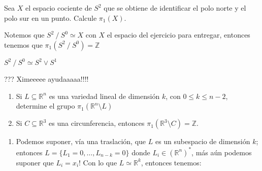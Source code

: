 \documentclass[11pt]{article}
\newcommand{\R}{{\mathbb{R}}}
\newcommand{\N}{{\mathbb{N}}}
\newenvironment{proof}[1][Demostraci\'on]{\begin{trivlist}
\item[\hskip \labelsep {\bfseries #1}]}{\end{trivlist}}
\newenvironment{declaration}[1][Afirmaci\'on]{\begin{trivlist}
\item[\hskip \labelsep {\bfseries #1}]}{\end{trivlist}}
\newcommand{\Z}{\mathbb{Z}}
\def \be{\begin{enumerate}}
\def \en{\end{enumerate}}
\begin{document}
\begin{enumerate}
\begin{proof}
\end{proof}



\item {Sea $X$ el espacio cociente de $S^2$ que se obtiene de identificar el polo norte y el polo sur en un punto. Calcule $\pi_1 (X)$.}

\begin{proof}

Notemos que $S^2 \ / \ S^0 \simeq X$ con $X$ el espacio del ejercicio para entregar, entonces tenemos que $\pi_1(S^2 \ / \ S^0)=\Z$

\begin{declaration}

$S^2 \ / \ S^0 \simeq S^2 \vee S^1$

\end{declaration}

\begin{proof}
??? Ximeeeee ayudaaaaa!!!!
\end{proof}

\end{proof}

\item{

\be
\item{ Si $L\subseteq \R^n$ es una variedad lineal de dimensi\'on $k$, con $0\leq k\leq n-2$, determine el grupo $\pi_1( \R^n\setminus L)$}
\item{ Si $C\subseteq \R^3$ es una circunferencia, entonces $\pi_1( \R^3\setminus C)= \Z$.}
\en

}

\begin{proof}

\begin{enumerate}

\item Podemos suponer, v\'ia una traslaci\'on, que $L$ es un subespacio de dimensi\'on $k$; entonces $L= \{ L_1=0 , \dots , L_{n-k}=0 \}$ donde $L_i \in (\R^n)^*$, m\'as a\'un podemos suponer que $L_i = x_i$! Con lo que $L \simeq \R^k$, entonces tenemos:


\end{enumerate}
\end{proof}
\end{enumerate}
\end{document}
